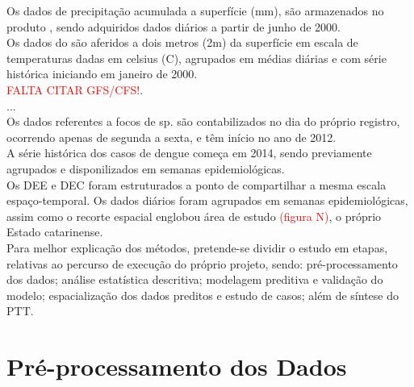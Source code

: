 \indent Os dados de precipitação acumulada a superfície (mm), são armazenados no produto ,  sendo adquiridos dados diários a partir de junho de 2000.\\
\indent Os dados do  são aferidos a dois metros (2m) da superfície em escala de temperaturas dadas em celsius (C), agrupados em médias diárias e com série histórica iniciando em janeiro de 2000.\\
\indent \textcolor{red}{FALTA CITAR GFS/CFS!}.\\
\indent ...\\
\indent Os dados referentes a focos de  sp. são contabilizados no dia do próprio registro, ocorrendo apenas de segunda a sexta, e têm início no ano de 2012.\\
\indent A série histórica dos casos de dengue começa em 2014, sendo previamente agrupados e disponilizados em semanas epidemiológicas.\\
\indent Os \acrshort{DEE} e \acrshort{DEC} foram estruturados a ponto de compartilhar a mesma escala espaço-temporal. Os dados diários foram agrupados em semanas epidemiológicas, assim como o recorte espacial englobou área de estudo \textcolor{red}{(figura N)}, o próprio Estado catarinense.\\
\indent Para melhor explicação dos métodos, pretende-se dividir o estudo em etapas, relativas ao percurso de execução do próprio projeto, sendo: pré-processamento dos dados; análise estatística descritiva; modelagem preditiva e validação do modelo; espacialização dos dados preditos e estudo de casos; além de síntese do \acrfull{PTT}.\\


\section{Pré-processamento dos Dados}

